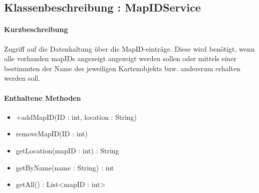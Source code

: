\subsection{Klassenbeschreibung : MapIDService}%
\paragraph*{Kurzbeschreibung}
Zugriff auf die Datenhaltung über die MapID-einträge. Diese wird benötigt, wenn alle vorhanden mapIDs angezeigt angezeigt werden sollen oder
mittels einer bestimmten der Name des jeweiligen Kartenobjekts bzw. andersrum erhalten werden soll.

\paragraph*{Enthaltene Methoden}
\begin{itemize}
    \item +addMapID(ID : int, location : String)
    \item removeMapID(ID : int)
    \item getLocation(mapID : int) : String
    \item getByName(name : String) : int
    \item getAll() : List<mapID : int>
\end{itemize}